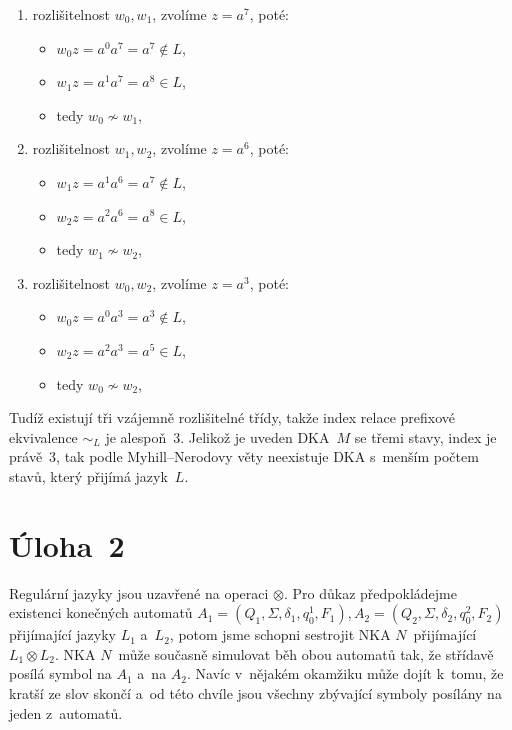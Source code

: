 \documentclass[a4paper, 11pt]{article}
\begin{document}
\begin{enumerate}
    \item rozlišitelnost $w_0, w_1$, zvolíme $z = a^7$, poté:
    \begin{itemize}
        \item $w_0z = a^0a^7 = a^7 \notin L$,
        \item $w_1z = a^1a^7 = a^8 \in L$,
        \item[$\rightarrow$] tedy $w_0 \nsim w_1$,
    \end{itemize}
    \item rozlišitelnost $w_1, w_2$, zvolíme $z = a^6$, poté:
    \begin{itemize}
        \item $w_1z = a^1a^6 = a^7 \notin L$,
        \item $w_2z = a^2a^6 = a^8 \in L$,
        \item[$\rightarrow$] tedy $w_1 \nsim w_2$,
    \end{itemize}
    \item rozlišitelnost $w_0, w_2$, zvolíme $z = a^3$, poté:
    \begin{itemize}
        \item $w_0z = a^0a^3 = a^3 \notin L$,
        \item $w_2z = a^2a^3 = a^5 \in L$,
        \item[$\rightarrow$] tedy $w_0 \nsim w_2$,
    \end{itemize}
\end{enumerate}

Tudíž existují tři vzájemně rozlišitelné třídy, takže index relace prefixové ekvivalence $\sim_L$ je alespoň~3.
Jelikož je uveden DKA~$M$ se třemi stavy, index je právě~3, tak podle Myhill--Nerodovy věty neexistuje DKA s~menším počtem stavů, který přijímá jazyk~$L$.

\newpage

\section*{Úloha~2}

Regulární jazyky jsou uzavřené na operaci $\otimes$.
Pro důkaz předpokládejme existenci konečných automatů $A_1 = \left( Q_1, \Sigma, \delta_1, q_0^1, F_1 \right), A_2 = \left( Q_2, \Sigma, \delta_2, q_0^2, F_2 \right)$ přijímající jazyky $L_1$ a~$L_2$, potom jsme schopni sestrojit NKA $N$~přijímající $L_1 \otimes L_2$.
NKA $N$~může současně simulovat běh obou automatů tak, že střídavě posílá symbol na $A_1$ a~na $A_2$.
Navíc v~nějakém okamžiku může dojít k~tomu, že kratší ze slov skončí a~od této chvíle jsou všechny zbývající symboly posílány na jeden z~automatů.
\end{document}
